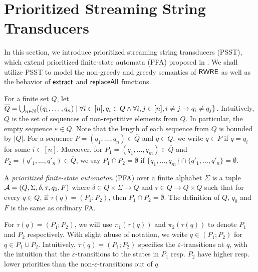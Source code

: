 
\section{Prioritized Streaming String Transducers}  \label{sect:psst}

In this section, we introduce prioritized streaming string transducers (PSST), which extend prioritized finite-state automata (PFA) proposed in \cite{BM17}. We shall utilize PSST to model  the non-greedy and greedy semantics of ${\sf RWRE}$ as well as the behavior of $\mathsf{extract}$ and $\mathsf{replaceAll}$ functions.

%
For a finite set $Q$, let $\overline{Q} = \bigcup_{n\in \mathbb{N}}\{ (q_1, \ldots, q_n) \mid \forall i \in [n], q_i \in Q \wedge \forall i,j \in[n], i \neq j \rightarrow q_i \neq q_j \}$. Intuitively, $\overline{Q}$ is the set of sequences of non-repetitive elements from $Q$. In particular, the empty sequence $\varepsilon \in \overline{Q}$. Note that the length of each sequence from $\overline{Q}$ is bounded by  $| Q |$. For a sequence $P = (q_1, \ldots, q_n) \in \overline{Q}$ and  $q \in Q$, we write $q \in P$ if  $q = q_i$ for some $i \in [n]$. Moreover, for $P_1 = (q_1, \ldots, q_m) \in \overline{Q}$ and $P_2 = (q'_1, \ldots, q'_n) \in \overline{Q}$, we say $P_1 \cap P_2 = \emptyset$ if $\{q_1, \ldots, q_m\} \cap \{q'_1, \ldots, q'_n\} = \emptyset$.


\begin{definition}\label{def-pfa}
  A \emph{prioritized finite-state automaton} (PFA) over a finite alphabet $\Sigma$ is a tuple $\mathcal{A}=(Q, \Sigma, \delta, \tau, q_0, F)$ where $\delta \in Q
  \times \Sigma \rightarrow \overline{Q}$ and $\tau \in Q \rightarrow \overline{Q} \times \overline{Q}$ such that for every $q \in Q$, if $\tau(q) = (P_1; P_2)$, then $P_1 \cap P_2 = \emptyset$. 
  The definition of $Q$, $q_0$ and $F$ is the same as ordinary FA.
\end{definition}
For $\tau(q) = (P_1; P_2)$, we will use $\pi_1(\tau(q))$ and $\pi_2(\tau(q))$ to denote $P_1$ and $P_2$ respectively.  With slight abuse of notation, we write $q\in (P_1; P_2)$ for $q\in P_1\cup P_2$. Intuitively, $\tau(q)=(P_1; P_2)$ specifies the $\varepsilon$-transitions at $q$, with the intuition that the $\varepsilon$-transitions to the states in $P_1$ resp. $P_2$ have higher resp. lower priorities than the non-$\varepsilon$-transitions out of $q$.
  
